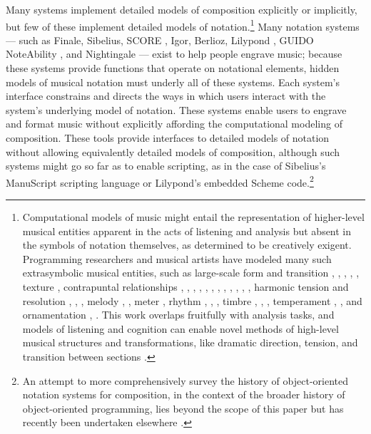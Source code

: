 \documentclass{article}
\begin{document}
Many systems implement detailed models of composition explicitly or implicitly,
but few of these implement detailed models of notation.\footnote{Computational
models of music might entail the representation of higher-level musical
entities apparent in the acts of listening and analysis but absent in the
symbols of notation themselves, as determined to be creatively exigent.
Programming researchers and musical artists have modeled many such
extrasymbolic musical entities, such as large-scale form and transition
\cite{polansky1991morphological}, \cite{uno1994temporal},
\cite{dobrian1995algorithmic}, \cite{abrams1999higher}, \cite{Yoo1983}, texture
\cite{Horenstein:2004kx}, contrapuntal relationships \cite{Boenn:2009oq},
\cite{Acevedo2005}, \cite{Anders:2011kl}, \cite{Balser:1990tg},
\cite{Jones:2000hc}, \cite{uno1994temporal}, \cite{Bell:1995ij},
\cite{farbood2001analysis}, \cite{Cope:2002fv}, \cite{Laurson:2005dz},
\cite{Polansky:2011fu}, \cite{Ebcioglu:1980kl}, harmonic tension and resolution
\cite{Melo2003}, \cite{Wiggins1999}, \cite{Foster:1995qa}, melody
\cite{Hornel:1993mi}, \cite{Smith:1992pi}, meter \cite{Hamanaka:2005ff}, rhythm
\cite{Nauert2007}, \cite{Degazio:1996lh}, \cite{Collins:2003bs}, timbre
\cite{Xenakis:1991fu}, \cite{Creasey:1996ye}, \cite{Osaka2004}, temperament
\cite{Seymour:2007qo}, \cite{Graf:2006il}, and ornamentation
\cite{Ariza:2003zt}, \cite{Chico-Topfer:1998jl}. This work overlaps fruitfully
with analysis tasks, and models of listening and cognition can enable novel
methods of high-level musical structures and transformations, like dramatic
direction, tension, and transition between sections \cite[108]{Collins2009}.}
Many notation systems --- such as Finale, Sibelius, SCORE \cite{Smith:1972mw},
Igor, Berlioz, Lilypond \cite{Nienhuys:2003ve}, GUIDO \cite{Hoos:1998bd}
NoteAbility \cite{hamel1noteability}, and Nightingale --- exist to help people
engrave music; because these systems provide functions that operate on
notational elements, hidden models of musical notation must underly all of
these systems. Each system's interface constrains and directs the ways in which
users interact with the system's underlying model of notation. These systems
enable users to engrave and format music without explicitly affording the
computational modeling of composition. These tools provide interfaces to
detailed models of notation without allowing equivalently detailed models of
composition, although such systems might go so far as to enable scripting, as
in the case of Sibelius's ManuScript \cite{Technology:qc} scripting language or
Lilypond's embedded Scheme code.\footnote{An attempt to more comprehensively
survey the history of object-oriented notation systems for composition, in the
context of the broader history of object-oriented programming, lies beyond the
scope of this paper but has recently been undertaken elsewhere
\cite{trevino2013compositional}.}
\end{document}
